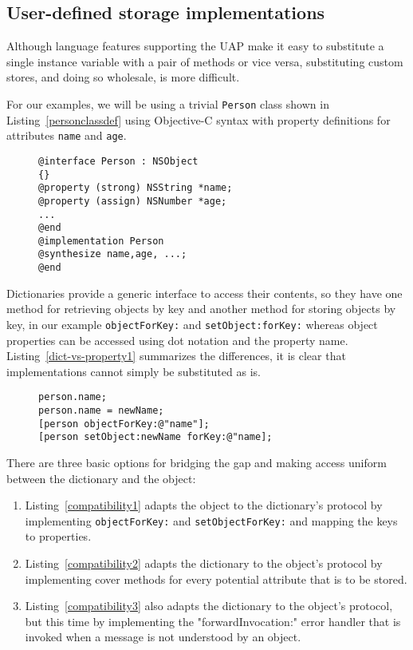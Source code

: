 \documentclass[preprint]{sigplanconf}
\begin{document}
\subsection{User-defined storage implementations}

Although language features supporting the UAP make it easy to substitute a single 
instance variable with a pair of methods or vice versa, substituting custom stores,
and doing so wholesale, is more difficult.

For our examples, we will be using a trivial {\tt Person} class shown in Listing~\ref{personclassdef}
using Objective-C syntax with property definitions for attributes {\tt name} and {\tt age}.

\begin{figure}[htbp]
\begin{lstlisting}[style=numbers,label=personclassdef,caption=Person class.]
@interface Person : NSObject 
{}
@property (strong) NSString *name;
@property (assign) NSNumber *age;
...
@end
@implementation Person
@synthesize name,age, ...;
@end
\end{lstlisting}
\end{figure}


Dictionaries provide a generic interface to access their contents, so they have
one method for retrieving objects by key and another method for storing objects
by key, in our example {\tt objectForKey:} and {\tt setObject:forKey:} whereas
object properties can be accessed using dot notation and the property name.
Listing~\ref{dict-vs-property1} summarizes the differences, it is clear that implementations
cannot simply be substituted as is.


\begin{figure}[htbp]
\begin{lstlisting}[style=numbers,label=dict-vs-property1,caption=Dictionary vs. Property.]
person.name;
person.name = newName;
[person objectForKey:@"name"];
[person setObject:newName forKey:@"name];
\end{lstlisting}
\end{figure}

There are three basic options for bridging the gap and making access uniform between the
dictionary and the object:
\begin{enumerate}
\item  Listing~\ref{compatibility1} adapts the object to the dictionary's protocol by
	 implementing {\tt objectForKey:} and {\tt setObjectForKey:} and mapping the keys
	 to properties.
\item Listing~\ref{compatibility2} adapts the dictionary to the object's protocol by 
	implementing cover methods for every potential attribute that is to be stored.
\item Listing~\ref{compatibility3} also adapts the dictionary to the object's protocol, but
	this time by implementing the "forwardInvocation:" error handler that is invoked
	when a message is not understood by an object.
\end{enumerate}
\end{document}
